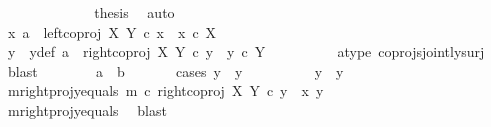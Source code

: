 \begin{isabellebody}
\ \ \ \ \ \ \ \ \ \ \isamarkupfalse%
\ \isamarkupfalse%
\ {\isacharquery}{\kern0pt}thesis\ \isamarkupfalse%
\ auto\isanewline
\ \ \ \ \ \ \ \ \isamarkupfalse%
\isanewline
\ \ \ \ \ \ \isamarkupfalse%
\isanewline
\ \ \ \ \isamarkupfalse%
\ \isanewline
\ \ \ \ \ \ \isamarkupfalse%
\ {\isachardoublequoteopen}{\isasymnexists}x{\isachardot}{\kern0pt}\ a\ {\isacharequal}{\kern0pt}\ left{\isacharunderscore}{\kern0pt}coproj\ X\ Y\ {\isasymcirc}\isactrlsub c\ x\ {\isasymand}\ x\ {\isasymin}\isactrlsub c\ X{\isachardoublequoteclose}\isanewline
\ \ \ \ \ \ \isamarkupfalse%
\ \isamarkupfalse%
\ y\ \ y{\isacharunderscore}{\kern0pt}def{\isacharcolon}{\kern0pt}\ {\isachardoublequoteopen}a\ {\isacharequal}{\kern0pt}\ right{\isacharunderscore}{\kern0pt}coproj\ X\ Y\ {\isasymcirc}\isactrlsub c\ y\ {\isasymand}\ y\ {\isasymin}\isactrlsub c\ Y{\isachardoublequoteclose}\isanewline
\ \ \ \ \ \ \ \ \isamarkupfalse%
\ a{\isacharunderscore}{\kern0pt}type\ coprojs{\isacharunderscore}{\kern0pt}jointly{\isacharunderscore}{\kern0pt}surj\ \isamarkupfalse%
\ blast\isanewline
\ \ \ \ \ \ \isamarkupfalse%
\ {\isachardoublequoteopen}a\ {\isacharequal}{\kern0pt}\ b{\isachardoublequoteclose}\isanewline
\ \ \ \ \ \ \isamarkupfalse%
{\isacharparenleft}{\kern0pt}cases\ {\isachardoublequoteopen}y\ {\isacharequal}{\kern0pt}\ y{}{\isachardoublequoteclose}{\isacharparenright}{\kern0pt}\isanewline
\ \ \ \ \ \ \ \ \isamarkupfalse%
\ {\isachardoublequoteopen}y\ {\isacharequal}{\kern0pt}\ y{}{\isachardoublequoteclose}\isanewline
\ \ \ \ \ \ \ \ \isamarkupfalse%
\ \ \isamarkupfalse%
\ m{\isacharunderscore}{\kern0pt}rightproj{\isacharunderscore}{\kern0pt}y{\isacharunderscore}{\kern0pt}equals{\isacharcolon}{\kern0pt}\ {\isachardoublequoteopen}m\ {\isasymcirc}\isactrlsub c\ right{\isacharunderscore}{\kern0pt}coproj\ X\ Y\ {\isasymcirc}\isactrlsub c\ y\ {\isacharequal}{\kern0pt}\ {\isasymlangle}x{}{\isacharcomma}{\kern0pt}\ y{}{\isasymrangle}{\isachardoublequoteclose}\isanewline
\ \ \ \ \ \ \ \ \ \ \isamarkupfalse%
\ m{\isacharunderscore}{\kern0pt}rightproj{\isacharunderscore}{\kern0pt}y{}{\isacharunderscore}{\kern0pt}equals\ \isamarkupfalse%
\ blast\isanewline
\ \ \ \ \ \ \ \ \isamarkupfalse%
\ \isamarkupfalse%

\end{isabellebody}
